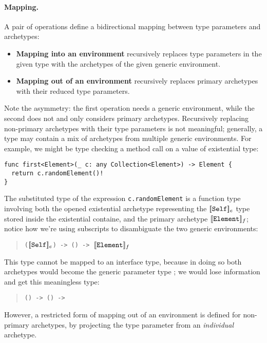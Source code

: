 \documentclass[../generics]{subfiles}
\begin{document}
\paragraph{Mapping.}
A pair of operations define a bidirectional mapping between type parameters and archetypes:
\begin{itemize}
\item {}\textbf{Mapping into an environment} recursively replaces type parameters in the given type with the archetypes of the given generic environment.
\item {}\textbf{Mapping out of an environment} recursively replaces primary archetypes with their reduced type parameters.
\end{itemize}
Note the asymmetry: the first operation needs a generic environment, while the second does not and only considers primary archetypes. Recursively replacing non-primary archetypes with their type parameters is not meaningful; generally, a type may contain a mix of archetypes from multiple generic environments. For example, we might be type checking a method call on a value of existential type:
\begin{Verbatim}
func first<Element>(_ c: any Collection<Element>) -> Element {
  return c.randomElement()!
}
\end{Verbatim}
The substituted type of the expression \texttt{c.randomElement} is a function type involving both the opened existential archetype representing the $[\![\texttt{Self}]\!]_e$ type stored inside the existential containe, and the primary archetype $[\![\texttt{Element}]\!]_f$; notice how we're using subscripts to disambiguate the two generic environments:
\begin{quote}
\texttt{($[\![\texttt{Self}]\!]_e$) -> () -> $[\![\texttt{Element}]\!]_f$}
\end{quote}
This type cannot be mapped to an interface type, because in doing so both archetypes would become the generic parameter type ; we would lose information and get this meaningless type:
\begin{quote}
\texttt{() -> () -> }
\end{quote}
However, a restricted form of mapping out of an environment is defined for non-primary archetypes, by projecting the type parameter from an \emph{individual} archetype.
\end{document}
